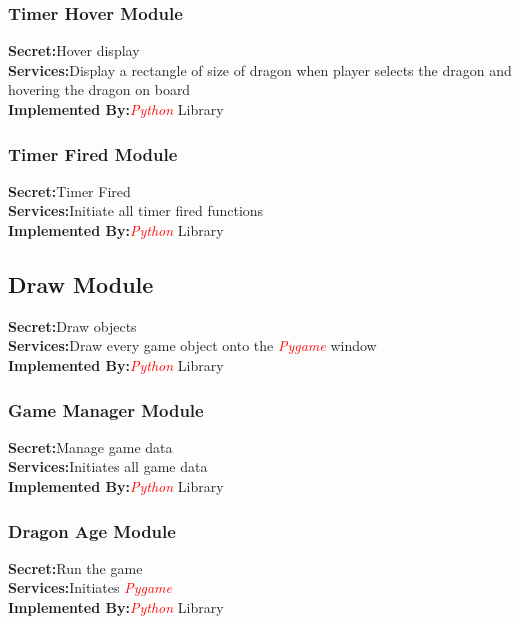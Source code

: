 \documentclass{article}
\begin{document}
\subsubsection{Timer Hover Module}
\textbf{Secret:}Hover display\\
\textbf{Services:}Display a rectangle of size of dragon when player selects the dragon and hovering the dragon on board\\
\textbf{Implemented By:}\textcolor{red}{\textit{Python}} Library\\

\subsubsection{Timer Fired Module}
\textbf{Secret:}Timer Fired\\
\textbf{Services:}Initiate all timer fired functions\\
\textbf{Implemented By:}\textcolor{red}{\textit{Python}} Library\\

\subsection{Draw Module}
\textbf{Secret:}Draw objects\\
\textbf{Services:}Draw every game object onto the \textcolor{red}{\textit{Pygame}} window\\
\textbf{Implemented By:}\textcolor{red}{\textit{Python}} Library\\

\subsubsection{Game Manager Module}
\textbf{Secret:}Manage game data\\
\textbf{Services:}Initiates all game data\\
\textbf{Implemented By:}\textcolor{red}{\textit{Python}} Library\\

\subsubsection{Dragon Age Module}
\textbf{Secret:}Run the game\\
\textbf{Services:}Initiates \textcolor{red}{\textit{Pygame}}\\
\textbf{Implemented By:}\textcolor{red}{\textit{Python}} Library\\
\end{document}
